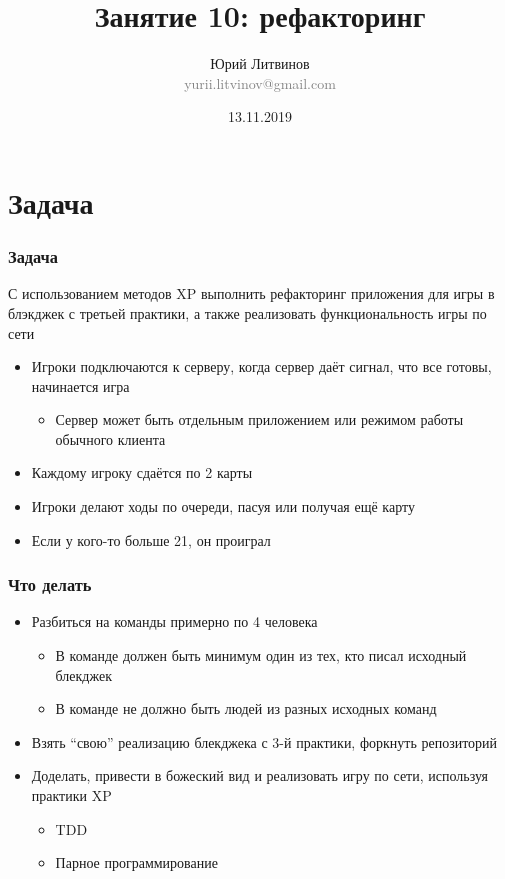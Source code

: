 \documentclass[xetex,mathserif,serif]{beamer}
\title{Занятие 10: рефакторинг}
\author[Юрий Литвинов]{Юрий Литвинов\\\small{\textcolor{gray}{yurii.litvinov@gmail.com}}}
\date{13.11.2019}
\begin{document}
	\frame{\titlepage}

	\section{Задача}

	\begin{frame}
		\frametitle{Задача}
		С использованием методов XP выполнить рефакторинг приложения для игры в блэкджек с третьей практики, а также реализовать функциональность игры по сети
		\begin{itemize}
			\item Игроки подключаются к серверу, когда сервер даёт сигнал, что все готовы, начинается игра
			\begin{itemize}
				\item Сервер может быть отдельным приложением или режимом работы обычного клиента
			\end{itemize}
			\item Каждому игроку сдаётся по 2 карты
			\item Игроки делают ходы по очереди, пасуя или получая ещё карту
			\item Если у кого-то больше 21, он проиграл
		\end{itemize}
	\end{frame}

	\begin{frame}
		\frametitle{Что делать}
		\begin{itemize}
			\item Разбиться на команды примерно по 4 человека
			\begin{itemize}
				\item В команде должен быть минимум один из тех, кто писал исходный блекджек
				\item В команде не должно быть людей из разных исходных команд 
			\end{itemize}
			\item Взять ``свою'' реализацию блекджека с 3-й практики, форкнуть репозиторий
			\item Доделать, привести в божеский вид и реализовать игру по сети, используя практики XP
			\begin{itemize}
				\item TDD
				\item Парное программирование
			\end{itemize}
		\end{itemize}
	\end{frame}
\end{document}
